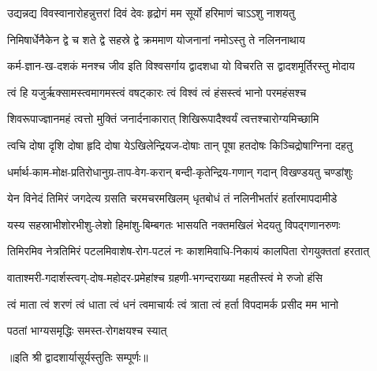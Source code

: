 

\twolineshloka
{उद्यन्नद्य विवस्वानारोहन्नुत्तरां दिवं देवः}
{हृद्रोगं मम सूर्यो हरिमाणं चाऽऽशु नाशयतु}%

\twolineshloka
{निमिषार्धेनैकेन द्वे च शते द्वे सहस्रे द्वे}
{क्रममाण योजनानां नमोऽस्तु ते नलिननाथाय}%

\twolineshloka
{कर्म-ज्ञान-ख-दशकं मनश्च जीव इति विश्वसर्गाय}
{द्वादशधा यो विचरति स द्वादशमूर्तिरस्तु मोदाय}%

\twolineshloka
{त्वं हि यजुर्ऋक्सामस्त्वमागमस्त्वं वषट्कारः}
{त्वं विश्वं त्वं हंसस्त्वं भानो परमहंसश्च}%

\twolineshloka
{शिवरूपाज्ज्ञानमहं त्वत्तो मुक्तिं जनार्दनाकारात्}
{शिखिरूपादैश्वर्यं त्वत्तश्चारोग्यमिच्छामि}%

\twolineshloka
{त्वचि दोषा दृशि दोषा हृदि दोषा येऽखिलेन्द्रियज-दोषाः}
{तान् पूषा हतदोषः किञ्चिद्रोषाग्निना दहतु}%

\twolineshloka
{धर्मार्थ-काम-मोक्ष-प्रतिरोधानुग्र-ताप-वेग-करान्}
{बन्दी-कृतेन्द्रिय-गणान् गदान् विखण्डयतु चण्डांशुः}%

\twolineshloka
{येन विनेदं तिमिरं जगदेत्य ग्रसति चरमचरमखिलम्}
{धृतबोधं तं नलिनीभर्तारं हर्तारमापदामीडे}%

\twolineshloka
{यस्य सहस्राभीशोरभीशु-लेशो हिमांशु-बिम्बगतः}
{भासयति नक्तमखिलं भेदयतु विपद्गणानरुणः}%

\twolineshloka
{तिमिरमिव नेत्रतिमिरं पटलमिवाशेष-रोग-पटलं नः}
{काशमिवाधि-निकायं कालपिता रोगयुक्ततां हरतात्}%

\twolineshloka
{वाताश्मरी-गदार्शस्त्वग्-दोष-महोदर-प्रमेहांश्च}
{ग्रहणी-भगन्दराख्या महतीस्त्वं मे रुजो हंसि}%

\twolineshloka
{त्वं माता त्वं शरणं त्वं धाता त्वं धनं त्वमाचार्यः}
{त्वं त्राता त्वं हर्ता विपदामर्क प्रसीद मम भानो}%

{पठतां भाग्यसमृद्धिः समस्त-रोगक्षयश्च स्यात्}

॥इति श्री द्वादशार्यासूर्यस्तुतिः सम्पूर्णः॥